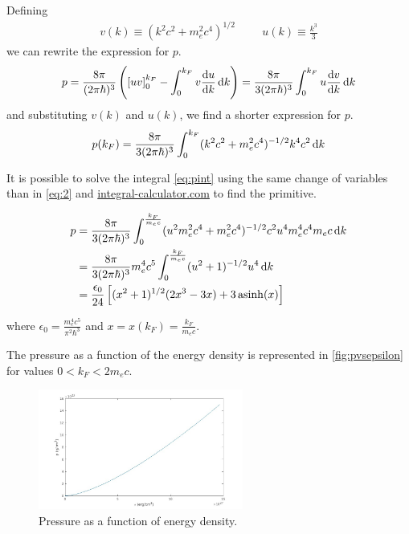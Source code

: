 \documentclass[a4paper]{article}
\DeclareMathOperator{\asinh}{asinh}
\begin{document}
Defining
\begin{gather*}
    v(k) \equiv (k^2c^2+m_e^2c^4)^{1/2} \hspace{1cm}
    u(k) \equiv \frac{k^3}{3}
\end{gather*}
we can rewrite the expression for $p$.
\begin{gather*}
    p = \frac{8\pi}{(2\pi\hbar)^3} \left(\left[uv\right]_0^{k_F} - \int^{k_F}_{0}v \odv{u}{k} \odif{k} \right)
    = \frac{8\pi}{3(2\pi\hbar)^3} \int^{k_F}_{0} u \odv{v}{k} \odif{k}
\end{gather*}
and substituting $v(k)$ and $u(k)$, we find a shorter expression for $p$.
\begin{equation} \label{eq:pint}
    p(k_F) = \frac{8\pi}{3(2\pi\hbar)^3} \int^{k_F}_{0}(k^2c^2+m_e^2c^4)^{-1/2} k^4 c^2 \odif{k}
\end{equation}

 It is possible to solve the integral \eqref{eq:pint} using the same change of variables than in \eqref{eq:2} and \href{https://www.integral-calculator.com}{integral-calculator.com} to find the primitive.

\begin{equation}
\begin{split}
        p &= \frac{8\pi}{3(2\pi\hbar)^3} \int^{\frac{k_F}{m_ec}}_{0} (u^2m_e^2c^4+m_e^2c^4)^{-1/2} c^2 u^4 m_e^4 c^4 m_e c \odif{k}\\
        & = \frac{8\pi}{3(2\pi\hbar)^3} m_e^4 c^5 \int^{\frac{k_F}{m_ec}}_{0} (u^2+1)^{-1/2} u^4 \odif{k} \\
        & = \frac{\epsilon_0}{24}\left[(x^2+1)^{1/2}(2x^3-3x)+3\asinh(x)\right]
\end{split}
\end{equation}

where $\epsilon_0 = \frac{m_e^4c^5}{\pi^2\hbar^3}$ and $x = x(k_F) = \frac{k_F}{m_ec}$.

The pressure as a function of the energy density is represented in \autoref{fig:pvsepsilon} for values $0< k_F < 2m_ec$.

\begin{figure}
\centering
\includegraphics[width=0.6\textwidth]{images/pvsepsilon.jpg}
\caption{Pressure as a function of energy density.}
\label{fig:pvsepsilon}
\end{figure}
\end{document}
